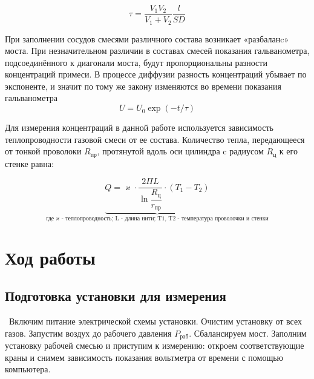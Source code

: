 \documentclass[a4paper,12pt]{article}
\theoremstyle{plain} %
\theoremstyle{definition} %
\theoremstyle{remark} %
\begin{document}
\begin{equation}
 \tau=\frac{V_1V_2}{V_1+V_2}\frac{l}{SD} 
\end{equation}


 При заполнении сосудов смесями различного состава возникает «разбаланc» моста. При незначительном различии в составах смесей показания гальванометра, подсоединённого к диагонали моста, будут пропорциональны разности концентраций примеси. В процессе диффузии
разность концентраций убывает по экспоненте, и значит по тому же закону изменяются во времени показания гальванометра
$$U=U_0 \exp(-t/\tau)$$

 Для измерения концентраций в данной работе используется зависимость теплопроводности газовой смеси от ее состава. Количество тепла, передающееся от тонкой проволоки $R_\text{пр}$, протянутой вдоль оси цилиндра c радиусом $R_\text{ц}$ к его стенке равна: 

\begin{equation}
\underbrace{Q = \varkappa \cdot \dfrac{2\Pi L}{\ln{\dfrac{R_\text{ц}}{r_\text{пр}}}} \cdot (T_1 - T_2)}_{\text{где $\varkappa$ - теплопроводность; L - длина нити; T1, T2 - температура проволочки и стенки}}
\end{equation}

\newpage

\section{Ход работы}

\subsection{Подготовка установки для измерения}\
\indent Включим питание электрической схемы установки. Очистим установку от всех газов. Запустим воздух до рабочего давления $P_\text{раб}$. Сбалансируем мост. Заполним установку рабочей смесью и приступим к измерению: откроем соответствующие краны и снимем зависимость показания вольтметра от времени с помощью компьютера.
\end{document}
